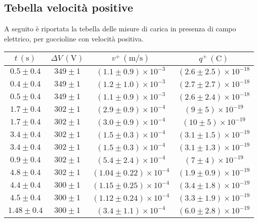 \subsection{Tebella velocità positive}
A seguito è riportata la tebella delle misure di carica in presenza di campo elettrico, per goccioline con velocità positiva.
        \renewcommand{\arraystretch}{1.3} %
        \begin{longtable}[C]{|c|c|c|c|}
            \hline
            $t \, (\mathrm{s})$ & $\Delta V \, (\mathrm{V})$ & $v^+ \, (\mathrm{m/s})$ & $q^+ \, (\mathrm{C})$ \\
            \hline
            $0.5 \pm 0.4$ & $349 \pm 1$ & $(1.1 \pm 0.9) \times 10^{-3}$ & $(2.6 \pm 2.5) \times 10^{-18}$ \\
            \hline
            $0.4 \pm 0.4$ & $349 \pm 1$ & $(1.2 \pm 1.0) \times 10^{-3}$ & $(2.7 \pm 2.7) \times 10^{-18}$ \\
            \hline
            $0.5 \pm 0.4$ & $349 \pm 1$ & $(1.1 \pm 0.9) \times 10^{-3}$ & $(2.6 \pm 2.4) \times 10^{-18}$ \\
            \hline
            $1.7 \pm 0.4$ & $302 \pm 1$ & $(2.9 \pm 0.9) \times 10^{-4}$ & $(9 \pm 5) \times 10^{-19}$ \\
            \hline
            $1.7 \pm 0.4$ & $302 \pm 1$ & $(3.0 \pm 0.9) \times 10^{-4}$ & $(10 \pm 5) \times 10^{-19}$ \\
            \hline
            $3.4 \pm 0.4$ & $302 \pm 1$ & $(1.5 \pm 0.3) \times 10^{-4}$ & $(3.1 \pm 1.5) \times 10^{-19}$ \\
            \hline
            $3.4 \pm 0.4$ & $302 \pm 1$ & $(1.5 \pm 0.3) \times 10^{-4}$ & $(3.1 \pm 1.3) \times 10^{-19}$ \\
            \hline
            $0.9 \pm 0.4$ & $302 \pm 1$ & $(5.4 \pm 2.4) \times 10^{-4}$ & $(7 \pm 4) \times 10^{-19}$ \\
            \hline
            $4.8 \pm 0.4$ & $302 \pm 1$ & $(1.04 \pm 0.22) \times 10^{-4}$ & $(1.9 \pm 0.9) \times 10^{-19}$ \\
            \hline
            $4.4 \pm 0.4$ & $300 \pm 1$ & $(1.15 \pm 0.25) \times 10^{-4}$ & $(3.4 \pm 1.8) \times 10^{-19}$ \\
            \hline
            $4.5 \pm 0.4$ & $300 \pm 1$ & $(1.12 \pm 0.24) \times 10^{-4}$ & $(3.3 \pm 1.9) \times 10^{-19}$ \\
            \hline
            $1.48 \pm 0.4$ & $300 \pm 1$ & $(3.4 \pm 1.1) \times 10^{-4}$ & $(6.0 \pm 2.8) \times 10^{-19}$ \\

\end{longtable}
